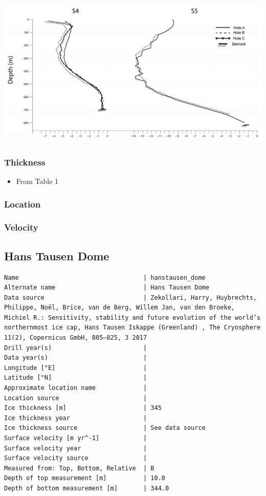 \documentclass[article,a4paper,times,11pt,twoside]{article}
\begin{document}
\begin{center}
\includegraphics[width=.9\linewidth]{h2015_s5b/harrington_2015_fig2_S4_S5.png}
\end{center}

\subsubsection{Thickness}
\label{sec:orgd583e06}

\begin{itemize}
\item From \textcite{harrington_2015} Table 1
\end{itemize}

\subsubsection{Location}
\label{sec:orgeed4c6d}

\subsubsection{Velocity}
\label{sec:org9a1634c}
\clearpage
\subsection{Hans Tausen Dome}
\label{sec:orga00cad9}
\begin{verbatim}
Name                                  | hanstausen_dome
Alternate name                        | Hans Tausen Dome
Data source                           | Zekollari, Harry, Huybrechts, Philippe, Noël, Brice, van de Berg, Willem Jan, van den Broeke, Michiel R.: Sensitivity, stability and future evolution of the world’s northernmost ice cap, Hans Tausen Iskappe (Greenland) , The Cryosphere 11(2), Copernicus GmbH, 805–825, 3 2017 
Drill year(s)                         | 
Data year(s)                          | 
Longitude [°E]                        | 
Latitude [°N]                         | 
Approximate location name             | 
Location source                       | 
Ice thickness [m]                     | 345
Ice thickness year                    | 
Ice thickness source                  | See data source
Surface velocity [m yr^-1]            | 
Surface velocity year                 | 
Surface velocity source               | 
Measured from: Top, Bottom, Relative  | B
Depth of top measurement [m]          | 10.0
Depth of bottom measurement [m]       | 344.0
\end{verbatim}
\end{document}
